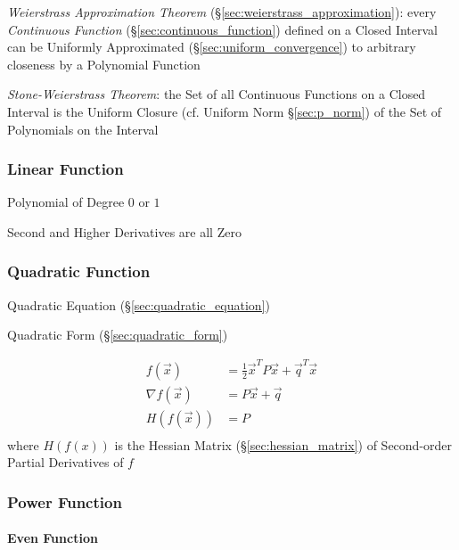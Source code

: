 \emph{Weierstrass Approximation Theorem}
(\S\ref{sec:weierstrass_approximation}): every \emph{Continuous Function}
(\S\ref{sec:continuous_function}) defined on a Closed Interval can be Uniformly
Approximated (\S\ref{sec:uniform_convergence}) to arbitrary closeness by a
Polynomial Function

\emph{Stone-Weierstrass Theorem}: the Set of all Continuous Functions on a
Closed Interval is the Uniform Closure (cf. Uniform Norm \S\ref{sec:p_norm}) of
the Set of Polynomials on the Interval



\subsubsection{Linear Function}\label{sec:linear_function}

Polynomial of Degree $0$ or $1$

Second and Higher Derivatives are all Zero



\subsubsection{Quadratic Function}\label{sec:quadratic_function}

\fist Quadratic Equation (\S\ref{sec:quadratic_equation})

\fist Quadratic Form (\S\ref{sec:quadratic_form})

\begin{align*}
  f(\vec{x})        & = \frac{1}{2}\vec{x}^T P \vec{x} + \vec{q}^T\vec{x} \\
  \nabla f(\vec{x}) & = P\vec{x} + \vec{q} \\
  H(f(\vec{x}))     & = P \\
\end{align*}
where $H(f(x))$ is the Hessian Matrix (\S\ref{sec:hessian_matrix}) of
Second-order Partial Derivatives of $f$



\subsubsection{Power Function}\label{sec:power_function}


\paragraph{Even Function}\label{sec:even_function}\hfill


